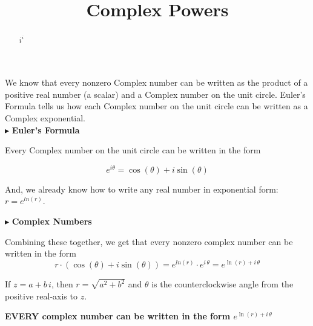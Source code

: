 \documentclass{ximera}
\title{Complex Powers}
\begin{document}
\begin{abstract}
$i^i$
\end{abstract}
\maketitle





We know that every nonzero Complex number can be written as the product of a positive real number (a scalar) and a Complex number on the unit circle.  Euler's Formula tells us how each Complex number on the unit circle can be written as a Complex exponential. \\




$\blacktriangleright$ \textbf{\textcolor{purple!85!blue}{Euler's Formula}}   


Every Complex number on the unit circle can be written in the form


\[   e^{i \theta} = \cos(\theta) + i \sin(\theta)         \]


And, we already know how to write any real number in exponential form: $r = e^{ln(r)}$.  





$\blacktriangleright$ \textbf{\textcolor{purple!85!blue}{Complex Numbers}}   




Combining these together, we get that every nonzero complex number can be written in the form  
\[
r \cdot (\cos(\theta) + i \sin(\theta))  = e^{ln(r)} \cdot e^{i \, \theta} = e^{\ln(r) + i \, \theta}
\]



If $z = a + b \, i$, then $r = \sqrt{a^2 + b^2}$ and $\theta$ is the counterclockwise angle from the positive real-axis to $z$.




\begin{center}

\textbf{\textcolor{red!80!black}{EVERY complex number can be written in the form $e^{\ln(r) + i \, \theta}$}}

\end{center}
\end{document}
